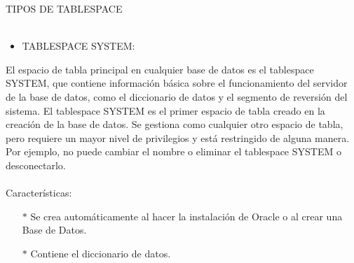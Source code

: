 TIPOS DE TABLESPACE
\\
\\
\begin{itemize}
	\item TABLESPACE SYSTEM:
\end{itemize}
\begin{adjustwidth}{0.40in}{0.0in}
	El espacio de tabla principal en cualquier base de datos es el tablespace SYSTEM, que contiene información básica sobre el funcionamiento del servidor de la base de datos, como el diccionario de datos y el segmento de reversión del sistema. El tablespace SYSTEM es el primer espacio de tabla creado en la creación de la base de datos. Se gestiona como cualquier otro espacio de tabla, pero requiere un mayor nivel de privilegios y está restringido de alguna manera. Por ejemplo, no puede cambiar el nombre o eliminar el tablespace SYSTEM o desconectarlo.	\\ \\
	Características:
	\begin{itemize}
		\item[$*$] Se crea automáticamente al hacer la instalación de Oracle o al crear una Base de Datos.
		\item[$*$] Contiene el diccionario de datos.\\
\\
	\end{itemize}		
\end{adjustwidth}

